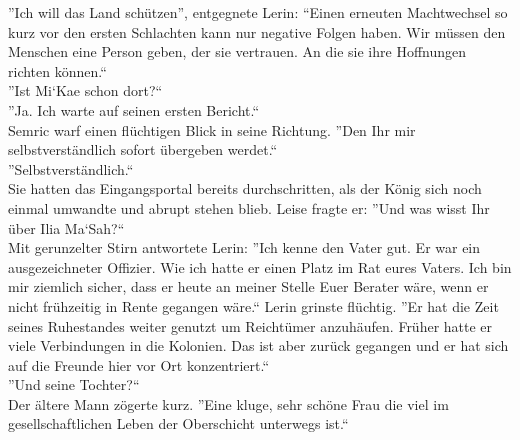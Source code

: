 ''Ich will das Land schützen'', entgegnete Lerin: ``Einen erneuten Machtwechsel so kurz vor den 
ersten Schlachten kann nur negative Folgen haben. Wir müssen den Menschen eine Person geben, der 
sie vertrauen. An die sie ihre Hoffnungen richten können.``\\
''Ist Mi‘Kae schon dort?``\\
''Ja. Ich warte auf seinen ersten Bericht.``\\
Semric warf einen flüchtigen Blick in seine Richtung. ''Den Ihr mir selbstverständlich sofort 
übergeben werdet.``\\
''Selbstverständlich.``\\
Sie hatten das Eingangsportal bereits durchschritten, als der König sich noch einmal umwandte und 
abrupt stehen blieb. Leise fragte er: ''Und was wisst Ihr über Ilia Ma‘Sah?``\\
Mit gerunzelter Stirn antwortete Lerin: ''Ich kenne den Vater gut. Er war ein ausgezeichneter 
Offizier. Wie ich hatte er einen Platz im Rat eures Vaters. Ich bin mir ziemlich sicher, dass er 
heute an meiner Stelle Euer Berater wäre, wenn er nicht frühzeitig in Rente gegangen wäre.`` Lerin 
grinste flüchtig. ''Er hat die Zeit seines Ruhestandes weiter genutzt um Reichtümer anzuhäufen. 
Früher hatte er viele Verbindungen in die Kolonien. Das ist aber zurück gegangen und er hat sich 
auf die Freunde hier vor Ort konzentriert.``\\
''Und seine Tochter?``\\
Der ältere Mann zögerte kurz. ''Eine kluge, sehr schöne Frau die viel im gesellschaftlichen Leben 
der Oberschicht unterwegs ist.``\\



